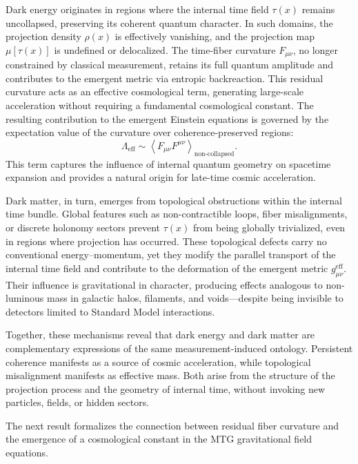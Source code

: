 \documentclass[11pt]{article}
\begin{document}
Dark energy originates in regions where the internal time field \( \tau(x) \) remains uncollapsed, preserving its coherent quantum character. In such domains, the projection density \( \rho(x) \) is effectively vanishing, and the projection map \( \mu[\tau(x)] \) is undefined or delocalized. The time-fiber curvature \( F_{\mu\nu} \), no longer constrained by classical measurement, retains its full quantum amplitude and contributes to the emergent metric via entropic backreaction. This residual curvature acts as an effective cosmological term, generating large-scale acceleration without requiring a fundamental cosmological constant. The resulting contribution to the emergent Einstein equations is governed by the expectation value of the curvature over coherence-preserved regions:
\begin{equation}
\Lambda_{\mathrm{eff}} \sim \left\langle F_{\mu\nu} F^{\mu\nu} \right\rangle_{\text{non-collapsed}}.
\end{equation}
This term captures the influence of internal quantum geometry on spacetime expansion and provides a natural origin for late-time cosmic acceleration.

Dark matter, in turn, emerges from topological obstructions within the internal time bundle. Global features such as non-contractible loops, fiber misalignments, or discrete holonomy sectors prevent \( \tau(x) \) from being globally trivialized, even in regions where projection has occurred. These topological defects carry no conventional energy–momentum, yet they modify the parallel transport of the internal time field and contribute to the deformation of the emergent metric \( g^{\mathrm{eff}}_{\mu\nu} \). Their influence is gravitational in character, producing effects analogous to non-luminous mass in galactic halos, filaments, and voids—despite being invisible to detectors limited to Standard Model interactions.

Together, these mechanisms reveal that dark energy and dark matter are complementary expressions of the same measurement-induced ontology. Persistent coherence manifests as a source of cosmic acceleration, while topological misalignment manifests as effective mass. Both arise from the structure of the projection process and the geometry of internal time, without invoking new particles, fields, or hidden sectors.

The next result formalizes the connection between residual fiber curvature and the emergence of a cosmological constant in the MTG gravitational field equations.
\end{document}
